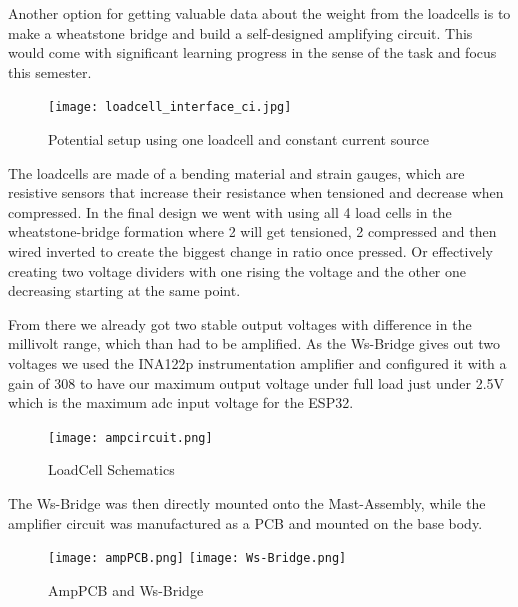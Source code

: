\documentclass[../report.tex]{subfiles}
\begin{document}
Another option for getting valuable data about the weight from the loadcells
is to make a wheatstone bridge and build a self-designed amplifying circuit.
This would come with significant learning progress in the sense of the task and 
focus this semester.

\begin{figure}[H]
  \centering
  \texttt{[image: loadcell\_interface\_ci.jpg]}
  \caption{Potential setup using one loadcell and constant current source}
\end{figure} 

The loadcells are made of a bending material and strain gauges, which are resistive
sensors that increase their resistance when tensioned and decrease when compressed.
In the final design we went with using all 4 load cells in the wheatstone-bridge formation
where 2 will get tensioned, 2 compressed and then wired inverted to create the biggest change
in ratio once pressed. Or effectively creating two voltage dividers with one rising the voltage
and the other one decreasing starting at the same point.

From there we already got two stable output voltages with difference in the millivolt range, 
which than had to be amplified.
As the Ws-Bridge gives out two voltages we used the INA122p instrumentation amplifier and 
configured it with a gain of 308 to have our maximum output voltage under full load just 
under 2.5V which is the maximum adc input voltage for the ESP32.

\begin{figure}[H]
  \centering
  \texttt{[image: ampcircuit.png]}
  \caption{LoadCell Schematics}
\end{figure} 

The Ws-Bridge was then directly mounted onto the Mast-Assembly, while the amplifier circuit 
was manufactured as a PCB and mounted on the base body.

\begin{figure}[H]
  \centering
  \texttt{[image: ampPCB.png]}
  \texttt{[image: Ws-Bridge.png]}
  \caption{AmpPCB and Ws-Bridge}
\end{figure} 
\end{document}

